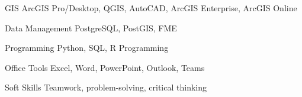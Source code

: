 
\vspace{0.6em}

\begin{cvskills}
  \cvskill
    {GIS}
    {ArcGIS Pro/Desktop, QGIS, AutoCAD, ArcGIS Enterprise, ArcGIS Online}

  \cvskill
    {Data Management}
    {PostgreSQL, PostGIS, FME}

  \cvskill
    {Programming}
    {Python, SQL, R Programming}

  \cvskill
    {Office Tools}
    {Excel, Word, PowerPoint, Outlook, Teams}

  \cvskill
    {Soft Skills}
    {Teamwork, problem-solving, critical thinking}
\end{cvskills}